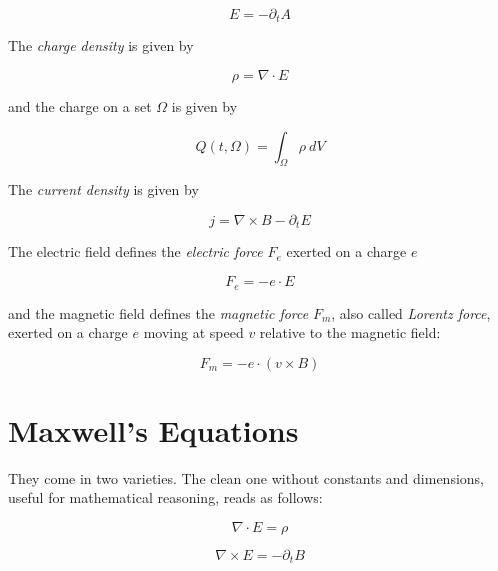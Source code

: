 \documentclass{article}
\begin{document}
\begin{equation} \label{eq:electric_field}
E = - \partial_t A
\end{equation}

The \emph{charge density} is given by

\begin{equation} \label{eq:charge_density}
\rho = \nabla \cdot E
\end{equation}

and the charge on a set $\Omega$ is given by

\begin{equation} \label{eq:charge}
Q(t, \Omega) = \int_{\Omega} \rho \: dV
\end{equation}

The \emph{current density} is given by

\begin{equation} \label{eq:current_density}
j = \nabla \times B - \partial_t E
\end{equation}

The electric field defines the \emph{electric force} $F_e$ exerted on a charge $e$

\begin{equation} \label{eq:electric_force}
F_e = - e \cdot E
\end{equation}

and the magnetic field defines the  \emph{magnetic force} $F_m$, also called \emph{Lorentz force}, exerted on a charge $e$ moving at speed $v$ relative to the magnetic field:

\begin{equation} \label{eq:magnetic_force}
F_m = - e \cdot (v \times B)
\end{equation}




\section{Maxwell's Equations}

They come in two varieties. The clean one without constants and dimensions, useful for mathematical reasoning, reads as follows:

\begin{equation}
\label{eq:Maxwell1}
\nabla \cdot E = \rho
\end{equation}

\begin{equation}
\label{eq:Maxwell2}
\nabla \times E = - \partial_t B
\end{equation}
\end{document}
